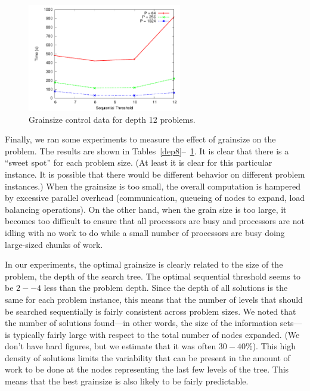 \documentclass[conference]{IEEEtran}
\begin{document}
\begin{figure}[h]
\centering
\includegraphics[width=0.6\textwidth]{plots/dep12.pdf}
\caption{Grainsize control data for depth 12 problems.}
\label{dep12}
\end{figure}

Finally, we ran some experiments to measure the effect of grainsize on the problem.  The results are shown in
Tables~\ref{dep8}--~\ref{dep12}.  It is clear that there is a ``sweet spot'' for each problem size.  (At least it is
clear for this particular instance.  It is possible that there would be different behavior on different problem
instances.)  When the grainsize is too small, the overall computation is hampered by excessive parallel overhead
(communication, queueing of nodes to expand, load balancing operations).  On the other hand, when the grain size is too
large, it becomes too difficult to ensure that all processors are busy and processors are not idling with no work to do
while a small number of processors are busy doing large-sized chunks of work.  

In our experiments, the optimal grainsize is clearly related to the size of the problem, the depth of the search tree.
The optimal sequential threshold seems to be $2--4$ less than the problem depth.  Since the depth of all solutions is
the same for each problem instance, this means that the number of levels that should be searched sequentially is fairly
consistent across problem sizes.  We noted that the number of solutions found---in other words, the size of the
information sets---is typically fairly large with respect to the total number of nodes expanded.  (We don't have hard
figures, but we estimate that it was often $30-40\%$).  This high density of solutions limits the variability that can
be present in the amount of work to be done at the nodes representing the last few levels of the tree.  This means that
the best grainsize is also likely to be fairly predictable.  
\end{document}
